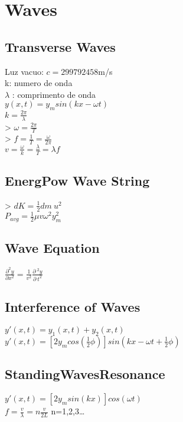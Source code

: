 \section{Waves}
\subsection*{Transverse Waves}
Luz vacuo: 
$c=299792458$m/s\\
k: numero de onda\\
$\lambda$ : comprimento de onda\\
$y\left(x,t\right)=y_msin\left(kx-\omega t\right)$\\
$k=\frac{2\pi }{\lambda }$\\
> $\omega =\frac{2\pi }{T}$\\
> $f=\frac{1}{T}=\frac{\omega }{2\pi }$\\
$v=\frac{\omega }{k}=\frac{\lambda }{T}=\lambda f$\\
\subsection*{EnergPow Wave String}
> $dK=\frac{1}{2}dm\:u^2$\\
$P_{avg}=\frac{1}{2}\mu v\omega ^2y_m^2$\\
\subsection*{Wave Equation}
$\frac{\partial ^2y}{\partial x^2}=\frac{1}{v^2}\frac{\partial \:^2y}{\partial \:t^2}$\\
\subsection*{Interference of Waves}
$y'\left(x,t\right)=y_1\left(x,t\right)+y_2\left(x,t\right)$\\
$y'\left(x,t\right)=\left[2y_mcos\left(\frac{1}{2}\phi \right)\right]sin\left(kx-\omega t+\frac{1}{2}\phi \right)$\\
\subsection*{StandingWavesResonance}
$y'\left(x,t\right)=\left[2y_msin\left(kx\right)\right]cos\left(\omega t\right)$\\
$f=\frac{v}{\lambda }=n\frac{v}{2L}$ n=1,2,3\dots\\
